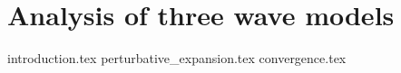 \chapter{Analysis of three wave models}\label{chapter.threewave}

{introduction.tex}
{perturbative_expansion.tex}
{convergence.tex}